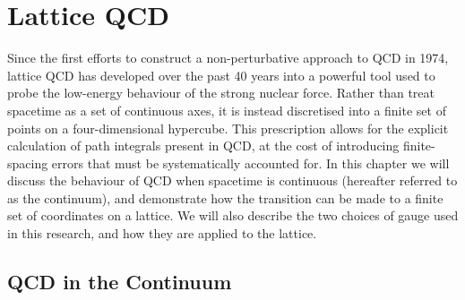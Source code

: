 
\chapter{Lattice QCD}\label{chapter:LatticeQCD}

\ifpdf
    \graphicspath{{Chapter2/Figs/Raster/}{Chapter2/Figs/PDF/}{Chapter2/Figs/}}
\else
    \graphicspath{{Chapter2/Figs/Vector/}{Chapter2/Figs/}}
\fi
Since the first efforts to construct a non-perturbative approach to QCD in 1974\cite{Wilson:1974sk}, lattice QCD has developed over the past 40 years into a powerful tool used to probe the low-energy behaviour of the strong nuclear force. Rather than treat spacetime as a set of continuous axes, it is instead discretised into a finite set of points on a four-dimensional hypercube. This prescription allows for the explicit calculation of path integrals present in QCD, at the cost of introducing finite-spacing errors that must be systematically accounted for. In this chapter we will discuss the behaviour of QCD when spacetime is continuous (hereafter referred to as the continuum), and demonstrate how the transition can be made to a finite set of coordinates on a lattice. We will also describe the two choices of gauge used in this research, and how they are applied to the lattice. 

\section{QCD in the Continuum}
